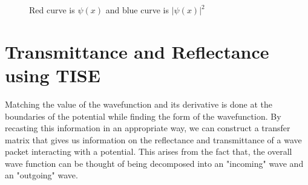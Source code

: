 \documentclass{article}
\begin{document}
\begin{figure}[h!]
\centering
{}
\qquad
{}

\caption{Red curve is $\psi(x)$ and blue curve is $|\psi(x)|^2$}
\end{figure}


\newpage
\section{Transmittance and Reflectance using TISE}
Matching the value of the wavefunction and its derivative is done at the boundaries of the potential while finding the form of the wavefunction. By recasting this information in an appropriate way, we can construct a transfer matrix that gives us information on the reflectance and transmittance of a wave packet interacting with a potential. This arises from the fact that, the overall wave function can be thought of being decomposed into an "incoming" wave and an "outgoing" wave.
\\
\end{document}
